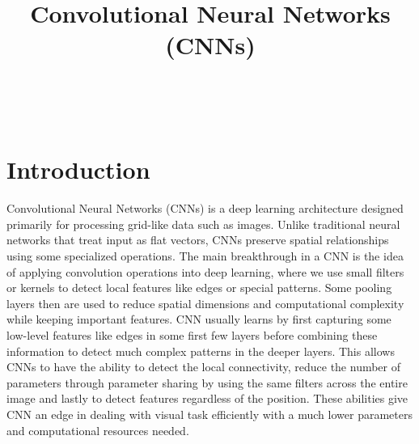 \documentclass[conference]{IEEEtran}
\begin{document}
\title{Convolutional Neural Networks (CNNs)}\\

\author{
}

\maketitle
\thispagestyle{plain}
\pagestyle{plain}



\section{Introduction}
Convolutional Neural Networks (CNNs) is a deep learning architecture designed primarily for processing grid-like data such as images. Unlike traditional neural networks that treat input as flat vectors, CNNs preserve spatial relationships using some specialized operations. The main breakthrough in a CNN is the idea of applying convolution operations into deep learning, where we use small filters or kernels to detect local features like edges or special patterns. Some pooling layers then are used to reduce spatial dimensions and computational complexity while keeping important features. CNN usually learns by first capturing some low-level features like edges in some first few layers before combining these information to detect much complex patterns in the deeper layers. This allows CNNs to have the ability to detect the local connectivity, reduce the number of parameters through parameter sharing by using the same filters across the entire image and lastly to detect features regardless of the position. These abilities give CNN an edge in dealing with visual task efficiently with a much lower parameters and computational resources needed.
\end{document}
